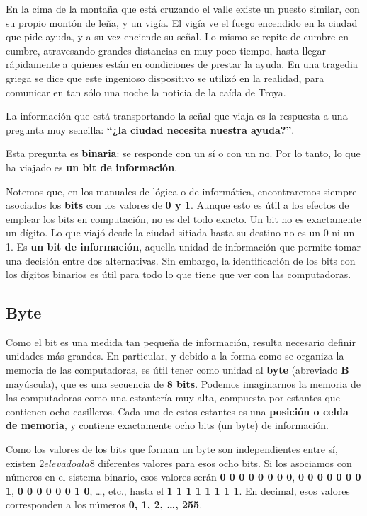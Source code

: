 \documentclass[spanish,A4,]{article}
\begin{document}
En la cima de la montaña que está cruzando el valle existe un puesto
similar, con su propio montón de leña, y un vigía. El vigía ve el fuego
encendido en la ciudad que pide ayuda, y a su vez enciende su señal. Lo
mismo se repite de cumbre en cumbre, atravesando grandes distancias en
muy poco tiempo, hasta llegar rápidamente a quienes están en condiciones
de prestar la ayuda. En una tragedia griega se dice que este ingenioso
dispositivo se utilizó en la realidad, para comunicar en tan sólo una
noche la noticia de la caída de Troya.

La información que está transportando la señal que viaja es la respuesta
a una pregunta muy sencilla: \textbf{``¿la ciudad necesita nuestra
ayuda?''}.

Esta pregunta es \textbf{binaria}: se responde con un sí o con un no.
Por lo tanto, lo que ha viajado es \textbf{un bit de información}.

Notemos que, en los manuales de lógica o de informática, encontraremos
siempre asociados los \textbf{bits} con los valores de \textbf{0 y 1}.
Aunque esto es útil a los efectos de emplear los bits en computación, no
es del todo exacto. Un bit no es exactamente un dígito. Lo que viajó
desde la ciudad sitiada hasta su destino no es un 0 ni un 1. Es
\textbf{un bit de información}, aquella unidad de información que
permite tomar una decisión entre dos alternativas. Sin embargo, la
identificación de los bits con los dígitos binarios es útil para todo lo
que tiene que ver con las computadoras.

\subsection{Byte}\label{byte}

Como el bit es una medida tan pequeña de información, resulta necesario
definir unidades más grandes. En particular, y debido a la forma como se
organiza la memoria de las computadoras, es útil tener como unidad al
\textbf{byte} (abreviado \textbf{B} mayúscula), que es una secuencia de
\textbf{8 bits}. Podemos imaginarnos la memoria de las computadoras como
una estantería muy alta, compuesta por estantes que contienen ocho
casilleros. Cada uno de estos estantes es una \textbf{posición o celda
de memoria}, y contiene exactamente ocho bits (un byte) de información.

Como los valores de los bits que forman un byte son independientes entre
sí, existen $2 elevado a la 8$ diferentes valores para esos ocho bits. Si los
asociamos con números en el sistema binario, esos valores serán
\textbf{0 0 0 0 0 0 0 0}, \textbf{0 0 0 0 0 0 0 1}, \textbf{0 0 0 0 0 0 1 0}, \ldots{}, etc.,
hasta el \textbf{1 1 1 1 1 1 1 1}. En decimal, esos valores corresponden a los
números \textbf{0, 1, 2, \ldots{}, 255}.
\end{document}
